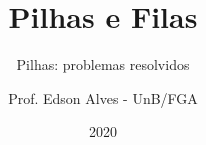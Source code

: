 \title{Pilhas e Filas}
\subtitle{Pilhas: problemas resolvidos}
\author{Prof. Edson Alves - UnB/FGA}
\date{2020}

